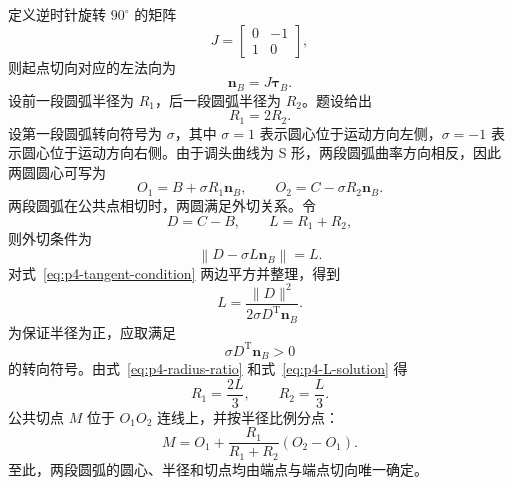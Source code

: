 定义逆时针旋转 $90^\circ$ 的矩阵
\begin{equation}
    J=
    \begin{bmatrix}
        0 & -1\\
        1 & 0
    \end{bmatrix},
    \label{eq:p4-J}
\end{equation}
则起点切向对应的左法向为
\begin{equation}
    \bm n_B=J\bm\tau_B.
    \label{eq:p4-normal}
\end{equation}
设前一段圆弧半径为 $R_1$，后一段圆弧半径为 $R_2$。题设给出
\begin{equation}
    R_1=2R_2.
    \label{eq:p4-radius-ratio}
\end{equation}
设第一段圆弧转向符号为 $\sigma$，其中 $\sigma=1$ 表示圆心位于运动方向左侧，$\sigma=-1$ 表示圆心位于运动方向右侧。由于调头曲线为 S 形，两段圆弧曲率方向相反，因此两圆圆心可写为
\begin{equation}
    O_1=B+\sigma R_1\bm n_B,
    \qquad
    O_2=C-\sigma R_2\bm n_B.
    \label{eq:p4-circle-centers}
\end{equation}
两段圆弧在公共点相切时，两圆满足外切关系。令
\begin{equation}
    D=C-B,\qquad L=R_1+R_2,
    \label{eq:p4-DL}
\end{equation}
则外切条件为
\begin{equation}
    \left\|D-\sigma L\bm n_B\right\|=L.
    \label{eq:p4-tangent-condition}
\end{equation}
对式~\eqref{eq:p4-tangent-condition} 两边平方并整理，得到
\begin{equation}
    L=\frac{\|D\|^2}{2\sigma D^{\mathrm T}\bm n_B}.
    \label{eq:p4-L-solution}
\end{equation}
为保证半径为正，应取满足
\begin{equation}
    \sigma D^{\mathrm T}\bm n_B>0
    \label{eq:p4-sigma-condition}
\end{equation}
的转向符号。由式~\eqref{eq:p4-radius-ratio} 和式~\eqref{eq:p4-L-solution} 得
\begin{equation}
    R_1=\frac{2L}{3},\qquad R_2=\frac{L}{3}.
    \label{eq:p4-radius-solution}
\end{equation}
公共切点 $M$ 位于 $O_1O_2$ 连线上，并按半径比例分点：
\begin{equation}
    M=O_1+\frac{R_1}{R_1+R_2}(O_2-O_1).
    \label{eq:p4-tangent-point}
\end{equation}
至此，两段圆弧的圆心、半径和切点均由端点与端点切向唯一确定。

